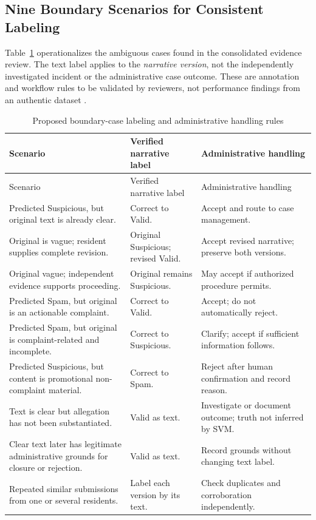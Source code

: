 \subsection{Nine Boundary Scenarios for Consistent Labeling}
Table~\ref{tab:op-boundary} operationalizes the ambiguous cases found in the consolidated evidence review. The text label applies to the \emph{narrative version}, not the independently investigated incident or the administrative case outcome. These are annotation and workflow rules to be validated by reviewers, not performance findings from an authentic dataset \cite{rottger2022,fleisig2024,li2023}.
\begin{longtable}{p{}p{}p{}}
\caption{Proposed boundary-case labeling and administrative handling rules}\label{tab:op-boundary}\\
\toprule Scenario & Verified narrative label & Administrative handling\\\midrule\endfirsthead
\toprule Scenario & Verified narrative label & Administrative handling\\\midrule\endhead
Predicted Suspicious, but original text is already clear. & Correct to Valid. & Accept and route to case management.\\
Original is vague; resident supplies complete revision. & Original Suspicious; revised Valid. & Accept revised narrative; preserve both versions.\\
Original vague; independent evidence supports proceeding. & Original remains Suspicious. & May accept if authorized procedure permits.\\
Predicted Spam, but original is an actionable complaint. & Correct to Valid. & Accept; do not automatically reject.\\
Predicted Spam, but original is complaint-related and incomplete. & Correct to Suspicious. & Clarify; accept if sufficient information follows.\\
Predicted Suspicious, but content is promotional non-complaint material. & Correct to Spam. & Reject after human confirmation and record reason.\\
Text is clear but allegation has not been substantiated. & Valid as text. & Investigate or document outcome; truth not inferred by SVM.\\
Clear text later has legitimate administrative grounds for closure or rejection. & Valid as text. & Record grounds without changing text label.\\
Repeated similar submissions from one or several residents. & Label each version by its text. & Check duplicates and corroboration independently.\\
\bottomrule\end{longtable}

